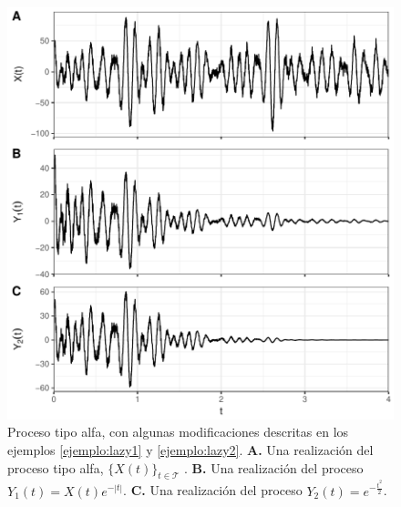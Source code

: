\documentclass[12pt,letterpaper]{book}
\newcommand{\abso}[1]{\left| #1 \right|}
\newcommand{\xt}{$\{X(t)\}_{t\in \mathcal{T}}$ }
\begin{document}
\begin{figure}
\centering
\includegraphics[width=\linewidth]{./img_mas_ejemplos/proceso_alfa_varios.pdf}
\caption[Proceso tipo alfa con algunas modificaciones]{Proceso tipo alfa, con algunas modificaciones descritas en los ejemplos \ref{ejemplo:lazy1} y \ref{ejemplo:lazy2}. \textbf{A.} Una realización del proceso tipo alfa, \xt. \textbf{B.} Una realización del proceso $Y_1(t) = X(t) e^{-\abso{t}}$. \textbf{C.} Una realización del proceso $Y_2(t) = e^{-\frac{t^2}{2}}$.}
\label{img:proceso_alfa_varios}
\end{figure}
\end{document}
